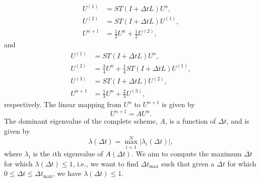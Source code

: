 \begin{equation}
\begin{aligned}
    U^{(1)} &= ST(I + \Delta t L)U^n, \\
    U^{(2)} &= ST(I + \Delta t L)U^{(1)},\\
    U^{n+1} &= \frac{1}{2}U^n + \frac{1}{2}U^{(2)},
\end{aligned}
\end{equation}
and 
\begin{equation}
\begin{aligned}
    U^{(1)} &= ST(I + \Delta t L)U^n, \\
    U^{(2)} &=  \frac{3}{4}U^n + \frac{1}{4}ST(I+\Delta t L)U^{(1)} ,\\
    U^{(3)} &= ST(I+\Delta t L)U^{(2)}, \\
    U^{n+1} &= \frac{1}{3}U^n + \frac{2}{3}U^{(3)},
\end{aligned}
\end{equation}
respectively.  
The linear mapping from $U^n$ to $U^{n+1}$ is given by
$$
U^{n+1} = AU^n.
$$
The dominant eigenvalue of the complete scheme, $A$, is a function of $\Delta t$, and is given by
$$
\lambda(\Delta t) = \max_{i=1}^{N}|\lambda_i(\Delta t)|,
$$
where $\lambda_i$ is the $i$th eigenvalue of $A(\Delta t)$.
 We aim to compute the maximum $\Delta t$ for which $\lambda(\Delta t) \leq 1$, i.e., we want to find $\Delta t_{\text{max}}$ such that given a $\Delta t$ for which $0\leq \Delta t \leq \Delta t_{\text{max}}$, we have $\lambda(\Delta t) \leq 1$. 
 







 



